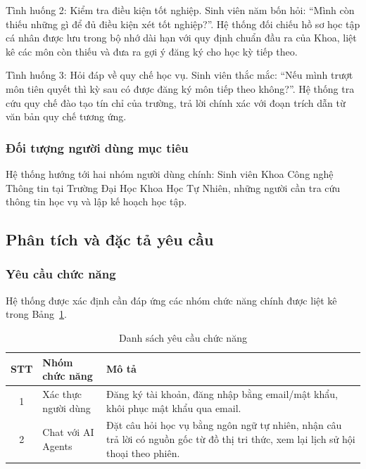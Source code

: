 Tình huống 2: Kiểm tra điều kiện tốt nghiệp.
Sinh viên năm bốn hỏi: ``Mình còn thiếu những gì để đủ điều kiện xét tốt nghiệp?''. Hệ thống đối chiếu hồ sơ học tập cá nhân được lưu trong bộ nhớ dài hạn với quy định chuẩn đầu ra của Khoa, liệt kê các môn còn thiếu và đưa ra gợi ý đăng ký cho học kỳ tiếp theo.

Tình huống 3: Hỏi đáp về quy chế học vụ.
Sinh viên thắc mắc: ``Nếu mình trượt môn tiên quyết thì kỳ sau có được đăng ký môn tiếp theo không?''. Hệ thống tra cứu quy chế đào tạo tín chỉ của trường, trả lời chính xác với đoạn trích dẫn từ văn bản quy chế tương ứng.

\subsubsection{Đối tượng người dùng mục tiêu}

Hệ thống hướng tới hai nhóm người dùng chính: Sinh viên Khoa Công nghệ Thông tin tại Trường Đại Học Khoa Học Tự Nhiên, những người cần tra cứu thông tin học vụ và lập kế hoạch học tập.

\subsection{Phân tích và đặc tả yêu cầu}

\subsubsection{Yêu cầu chức năng}

Hệ thống được xác định cần đáp ứng các nhóm chức năng chính được liệt kê trong Bảng~\ref{tab:yc_chuc_nang}.

\begin{table}[H]
	\centering
	\caption{Danh sách yêu cầu chức năng}
	\label{tab:yc_chuc_nang}

	\renewcommand{\arraystretch}{1.4}
	\begin{tabular}{|c|>{\raggedright\arraybackslash}p{4cm}|>{\raggedright\arraybackslash}p{8.5cm}|}
		\hline
		STT & Nhóm chức năng & Mô tả \\ \hline
		1 & Xác thực người dùng & Đăng ký tài khoản, đăng nhập bằng email/mật khẩu, khôi phục mật khẩu qua email. \\ \hline
		2 & Chat với AI Agents & Đặt câu hỏi học vụ bằng ngôn ngữ tự nhiên, nhận câu trả lời có nguồn gốc từ đồ thị tri thức, xem lại lịch sử hội thoại theo phiên. \\ \hline
	\end{tabular}
\end{table}

